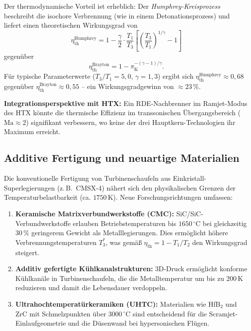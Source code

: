 ﻿\documentclass[12pt,a4paper]{article}
\theoremstyle{remark}
\newcommand{\Ma}{\mathrm{Ma}}
\newcommand{\piK}{\pi_{\mathrm{K}}}
\newcommand{\etath}{\eta_{\mathrm{th}}}
\begin{document}
Der thermodynamische Vorteil ist erheblich:
Der \emph{Humphrey-Kreisprozess} beschreibt die isochore Verbrennung
(wie in einem Detonationsprozess) und liefert einen theoretischen
Wirkungsgrad von
\begin{equation}
  \etath^{\mathrm{Humphrey}} = 1 - \frac{\gamma}{2} \cdot \frac{T_1}{T_3}
                               \left[\left(\frac{T_3}{T_1}\right)^{1/\gamma} - 1\right]
\end{equation}
gegen\"uber
\begin{equation}
  \etath^{\mathrm{Brayton}} = 1 - \piK^{-(\gamma-1)/\gamma}.
\end{equation}
F\"ur typische Parameterwerte ($T_3/T_1 = 5{,}0$, $\gamma = 1{,}3$) ergibt sich
$\etath^{\mathrm{Humphrey}} \approx 0{,}68$ gegen\"uber $\etath^{\mathrm{Brayton}} \approx 0{,}55$
-- ein Wirkungsgradgewinn von $\approx 23\,\%$.

\textbf{Integrationsperspektive mit HTX:}
Ein RDE-Nachbrenner im Ramjet-Modus des HTX k\"onnte die thermische Effizienz
im transsonischen \"Ubergangsbereich ($\Ma \approx 2$) signifikant verbessern,
wo keine der drei Hauptkern-Technologien ihr Maximum erreicht.

\subsection{Additive Fertigung und neuartige Materialien}

Die konventionelle Fertigung von Turbinenschaufeln aus
Einkristall-Superlegierungen (z.\,B.\ CMSX-4) n\"ahert sich den physikalischen
Grenzen der Temperaturbelastbarkeit (ca. $1750\,\mathrm{K}$).
Neue Forschungsrichtungen umfassen:

\begin{enumerate}[label=(\arabic*)]
  \item \textbf{Keramische Matrixverbundwerkstoffe (CMC):}
        SiC/SiC-Verbundwerkstoffe erlauben Betriebstemperaturen bis $1650\,^\circ\mathrm{C}$
        bei gleichzeitig $30\,\%$ geringerem Gewicht als Metalllegierungen.
        Dies erm\"oglicht h\"ohere Verbrennungstemperaturen $T_3^*$,
        was gem\"a{\ss} $\etath = 1 - T_1/T_2$ den Wirkungsgrad steigert.

  \item \textbf{Additiv gefertigte Kühlkanalstrukturen:}
        3D-Druck erm\"oglicht konforme K\"uhlkan\"ale in Turbinenschaufeln,
        die die Metalltemperatur um bis zu $200\,\mathrm{K}$ reduzieren
        und damit die Lebensdauer verdoppeln.

  \item \textbf{Ultrahochtemperat\"urkeramiken (UHTC):}
        Materialien wie HfB$_2$ und ZrC mit Schmelzpunkten \"uber $3000\,^\circ\mathrm{C}$
        sind entscheidend f\"ur die Scramjet-Einlaufgeometrie und die D\"usenwand
        bei hypersonischen Fl\"ugen.
\end{enumerate}
\end{document}
